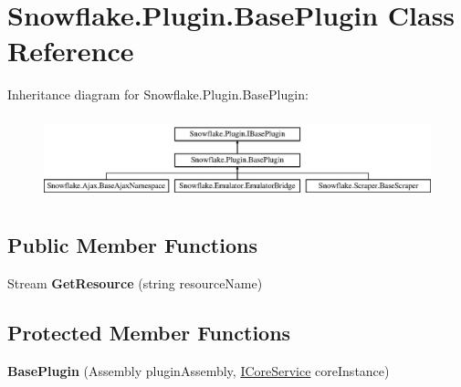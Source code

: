 \hypertarget{class_snowflake_1_1_plugin_1_1_base_plugin}{}\section{Snowflake.\+Plugin.\+Base\+Plugin Class Reference}
\label{class_snowflake_1_1_plugin_1_1_base_plugin}
Inheritance diagram for Snowflake.\+Plugin.\+Base\+Plugin\+:\begin{figure}[H]
\begin{center}
\leavevmode
\includegraphics[height=2.434783cm]{class_snowflake_1_1_plugin_1_1_base_plugin}
\end{center}
\end{figure}
\subsection*{Public Member Functions}
\begin{DoxyCompactItemize}
\item 
\hypertarget{class_snowflake_1_1_plugin_1_1_base_plugin_af6ba0fbb132d9dcb8ad26ad4806a353e}{}Stream {\bfseries Get\+Resource} (string resource\+Name)\label{class_snowflake_1_1_plugin_1_1_base_plugin_af6ba0fbb132d9dcb8ad26ad4806a353e}

\end{DoxyCompactItemize}
\subsection*{Protected Member Functions}
\begin{DoxyCompactItemize}
\item 
\hypertarget{class_snowflake_1_1_plugin_1_1_base_plugin_aafe9dc626650dca67a5062a8f794ccab}{}{\bfseries Base\+Plugin} (Assembly plugin\+Assembly, \hyperlink{interface_snowflake_1_1_service_1_1_i_core_service}{I\+Core\+Service} core\+Instance)\label{class_snowflake_1_1_plugin_1_1_base_plugin_aafe9dc626650dca67a5062a8f794ccab}

\end{DoxyCompactItemize}

